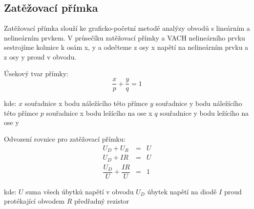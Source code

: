 	\subsection{Zatěžovací přímka}
		\indent\indent
		Zatěžovací přímka slouží ke graficko-početní metodě analýzy obvodů s lineárním a nelineárním prvkem. V průsečíku zatěžovací přímky a VACH nelineárního prvku sestrojíme kolmice k osám x, y a odečteme z osy x napětí na nelineárním prvku a z osy y proud v obvodu.
		
		Úsekový tvar přímky:
		\begin{equation}
  		\dfrac{x}{p} + \dfrac{y}{q} = 1
  	\end{equation}
		
		\hspace*{2cm}kde:\newline    
  	\hspace*{4cm}$x$ \dotfill souřadnice x bodu náležícího této přímce\hspace*{4cm}\newline
  	\hspace*{4cm}$y$ \dotfill souřadnice y bodu náležícího této přímce\hspace*{4cm}\newline
  	\hspace*{4cm}$p$ \dotfill souřadnice x bodu ležícího na ose x\hspace*{4cm}\newline
  	\hspace*{4cm}$q$ \dotfill souřadnice y bodu ležícího na ose y\hspace*{4cm}\newline

		
		Odvození rovnice pro zatěžovací přímku:
		\begin{eqnarray}
      U_D + U_R &=& U \nonumber\\
      U_D + IR &=& U \nonumber\\
      \dfrac{U_D}{U} + \dfrac{IR}{U} &=& 1
    \end{eqnarray}
		  
		\hspace*{2cm}kde:\newline    
		\hspace*{4cm}$U$ \dotfill suma všech úbytků napětí v obvodu\hspace*{4cm}\newline
		\hspace*{4cm}$U_D$ \dotfill úbytek napětí na diodě\hspace*{4cm}\newline
		\hspace*{4cm}$I$ \dotfill proud protékající obvodem\hspace*{4cm}\newline
		\hspace*{4cm}$R$ \dotfill předřadný rezistor\hspace*{4cm}\newline		
  	
